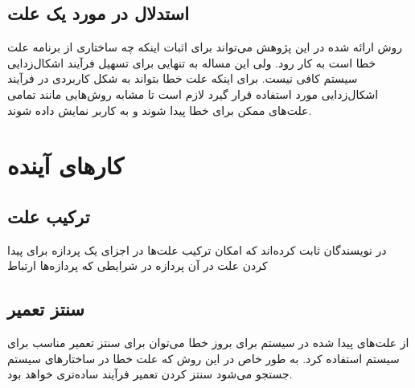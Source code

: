 \subsection{استدلال در مورد یک علت}
روش ارائه شده در این پژوهش می‌تواند برای اثبات اینکه چه ساختاری از برنامه علت خطا است به کار رود. 
ولی این مساله به تنهایی برای تسهیل فرآیند اشکال‌زدایی سیستم کافی نیست.
برای اینکه علت خطا بتواند به شکل کاربردی در فرآیند اشکال‌زدایی مورد استفاده قرار گیرد لازم است تا مشابه روش‌هایی مانند
\cite{chockler}
تمامی علت‌های ممکن برای خطا پیدا شوند و به کاربر نمایش داده شوند.

\section{کار‌های آینده}

\subsection{ترکیب علت}
در 
\cite{causal-hml}
نویسندگان ثابت کرده‌اند که امکان ترکیب علت‌ها در اجزای یک پردازه برای پیدا کردن علت در آن پردازه در شرایطی که پردازه‌ها ارتباط  


\subsection{سنتز تعمیر}
از علت‌های پیدا شده در سیستم برای بروز خطا می‌توان برای سنتز تعمیر مناسب برای سیستم استفاده کرد.
به طور خاص در این روش که علت خطا در ساختار‌های سیستم جستجو می‌شود سنتز کردن تعمیر فرآیند ساده‌تری خواهد بود.
